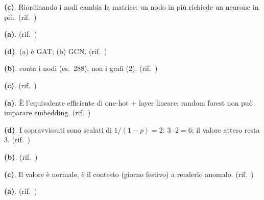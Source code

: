\begin{soluzione}
\textbf{(c)}. Riordinando i nodi cambia la matrice; un nodo in più richiede un neurone in più. (rif.\ )
\end{soluzione}

\begin{soluzione}
\textbf{(a)}. (rif.\ )
\end{soluzione}

\begin{soluzione}
\textbf{(d)}. (a) è GAT; (b) GCN. (rif.\ )
\end{soluzione}

\begin{soluzione}
\textbf{(b)}.  conta i nodi (es.\ 288), non i grafi (2). (rif.\ )
\end{soluzione}

\begin{soluzione}
\textbf{(c)}. (rif.\ )
\end{soluzione}

\begin{soluzione}
\textbf{(a)}. È l'equivalente efficiente di one-hot + layer lineare; random forest non può imparare embedding. (rif.\ )
\end{soluzione}

\begin{soluzione}
\textbf{(d)}. I sopravvissuti sono scalati di $1/(1-p) = 2$: $3\cdot 2 = 6$; il valore atteso resta 3. (rif.\ )
\end{soluzione}

\begin{soluzione}
\textbf{(b)}. (rif.\ )
\end{soluzione}

\begin{soluzione}
\textbf{(c)}. Il valore è normale, è il contesto (giorno festivo) a renderlo anomalo. (rif.\ )
\end{soluzione}

\begin{soluzione}
\textbf{(a)}. (rif.\ )
\end{soluzione}

